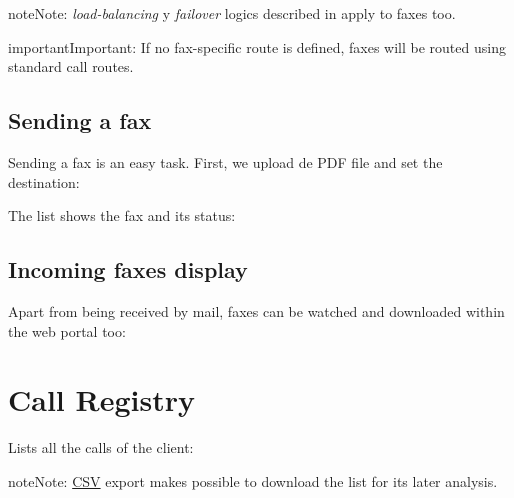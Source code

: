 \documentclass[letterpaper,10pt,english]{sphinxmanual}
\begin{document}
\begin{notice}{note}{Note:}
\emph{load-balancing} y \emph{failover} logics described in {\hyperref[brand/routing/outgoing_routing:routes\string-metrics]{}}
apply to faxes too.
\end{notice}

\begin{notice}{important}{Important:}
If no fax-specific route is defined, faxes will be routed using
standard call routes.
\end{notice}


\subsection{Sending a fax}
\label{company/faxing:sending-a-fax}
Sending a fax is an easy task. First, we upload de PDF file and set the destination:


The list shows the fax and its status:



\subsection{Incoming faxes display}
\label{company/faxing:incoming-faxes-display}
Apart from being received by mail, faxes can be watched and downloaded within
the web portal too:

\noindent{}


\section{Call Registry}
\label{company/call_registry::doc}\label{company/call_registry:call-registry}\label{company/call_registry:id1}
Lists all the calls of the client:

\noindent{}

\begin{notice}{note}{Note:}
\href{https://es.wikipedia.org/wiki/CSV}{CSV} export makes possible to
download the list for its later analysis.
\end{notice}
\end{document}
